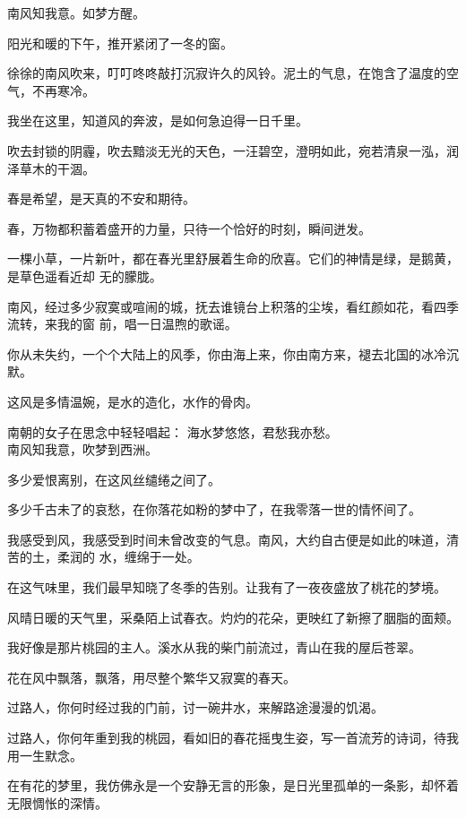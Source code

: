 \documentclass[12pt,a4paper]{article}
\def\blankrev{\vspace{1ex}}									%
\begin{document}

		南风知我意。如梦方醒。

		\blankrev
		阳光和暖的下午，推开紧闭了一冬的窗。\par
		徐徐的南风吹来，叮叮咚咚敲打沉寂许久的风铃。泥土的气息，在饱含了温度的空气，不再寒冷。

		我坐在这里，知道风的奔波，是如何急迫得一日千里。

		吹去封锁的阴霾，吹去黯淡无光的天色，一汪碧空，澄明如此，宛若清泉一泓，润泽草木的干涸。\par
		春是希望，是天真的不安和期待。\par
		春，万物都积蓄着盛开的力量，只待一个恰好的时刻，瞬间迸发。

		一棵小草，一片新叶，都在春光里舒展着生命的欣喜。它们的神情是绿，是鹅黄，是草色遥看近却
	无的朦胧。

		南风，经过多少寂寞或喧闹的城，抚去谁镜台上积落的尘埃，看红颜如花，看四季流转，来我的窗
	前，唱一日温煦的歌谣。

		你从未失约，一个个大陆上的风季，你由海上来，你由南方来，褪去北国的冰冷沉默。\par
		这风是多情温婉，是水的造化，水作的骨肉。

		南朝的女子在思念中轻轻唱起：
		\shortpoem{}{}{}
		海水梦悠悠，君愁我亦愁。\\
		南风知我意，吹梦到西洲。\\
		\endshortpoem

		多少爱恨离别，在这风丝缱绻之间了。\par
		多少千古未了的哀愁，在你落花如粉的梦中了，在我零落一世的情怀间了。

		我感受到风，我感受到时间未曾改变的气息。南风，大约自古便是如此的味道，清苦的土，柔润的
	水，缠绵于一处。

		在这气味里，我们最早知晓了冬季的告别。让我有了一夜夜盛放了桃花的梦境。

		风晴日暖的天气里，采桑陌上试春衣。灼灼的花朵，更映红了新擦了胭脂的面颊。

		我好像是那片桃园的主人。溪水从我的柴门前流过，青山在我的屋后苍翠。\par
		花在风中飘落，飘落，用尽整个繁华又寂寞的春天。

		过路人，你何时经过我的门前，讨一碗井水，来解路途漫漫的饥渴。\par
		过路人，你何年重到我的桃园，看如旧的春花摇曳生姿，写一首流芳的诗词，待我用一生默念。

		在有花的梦里，我仿佛永是一个安静无言的形象，是日光里孤单的一条影，却怀着无限惆怅的深情。
\end{document}
